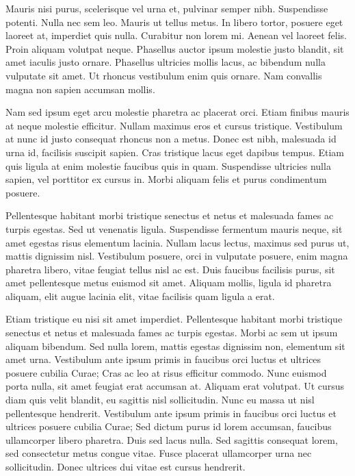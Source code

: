 Mauris nisi purus, scelerisque vel urna et, pulvinar semper nibh. Suspendisse potenti. Nulla nec sem leo. Mauris ut tellus metus. In libero tortor, posuere eget laoreet at, imperdiet quis nulla. Curabitur non lorem mi. Aenean vel laoreet felis. Proin aliquam volutpat neque. Phasellus auctor ipsum molestie justo blandit, sit amet iaculis justo ornare. Phasellus ultricies mollis lacus, ac bibendum nulla vulputate sit amet. Ut rhoncus vestibulum enim quis ornare. Nam convallis magna non sapien accumsan mollis.

Nam sed ipsum eget arcu molestie pharetra ac placerat orci. Etiam finibus mauris at neque molestie efficitur. Nullam maximus eros et cursus tristique. Vestibulum at nunc id justo consequat rhoncus non a metus. Donec est nibh, malesuada id urna id, facilisis suscipit sapien. Cras tristique lacus eget dapibus tempus. Etiam quis ligula at enim molestie faucibus quis in quam. Suspendisse ultricies nulla sapien, vel porttitor ex cursus in. Morbi aliquam felis et purus condimentum posuere.

Pellentesque habitant morbi tristique senectus et netus et malesuada fames ac turpis egestas. Sed ut venenatis ligula. Suspendisse fermentum mauris neque, sit amet egestas risus elementum lacinia. Nullam lacus lectus, maximus sed purus ut, mattis dignissim nisl. Vestibulum posuere, orci in vulputate posuere, enim magna pharetra libero, vitae feugiat tellus nisl ac est. Duis faucibus facilisis purus, sit amet pellentesque metus euismod sit amet. Aliquam mollis, ligula id pharetra aliquam, elit augue lacinia elit, vitae facilisis quam ligula a erat.

Etiam tristique eu nisi sit amet imperdiet. Pellentesque habitant morbi tristique senectus et netus et malesuada fames ac turpis egestas. Morbi ac sem ut ipsum aliquam bibendum. Sed nulla lorem, mattis egestas dignissim non, elementum sit amet urna. Vestibulum ante ipsum primis in faucibus orci luctus et ultrices posuere cubilia Curae; Cras ac leo at risus efficitur commodo. Nunc euismod porta nulla, sit amet feugiat erat accumsan at. Aliquam erat volutpat. Ut cursus diam quis velit blandit, eu sagittis nisl sollicitudin. Nunc eu massa ut nisl pellentesque hendrerit. Vestibulum ante ipsum primis in faucibus orci luctus et ultrices posuere cubilia Curae; Sed dictum purus id lorem accumsan, faucibus ullamcorper libero pharetra. Duis sed lacus nulla. Sed sagittis consequat lorem, sed consectetur metus congue vitae. Fusce placerat ullamcorper urna nec sollicitudin. Donec ultrices dui vitae est cursus hendrerit.

